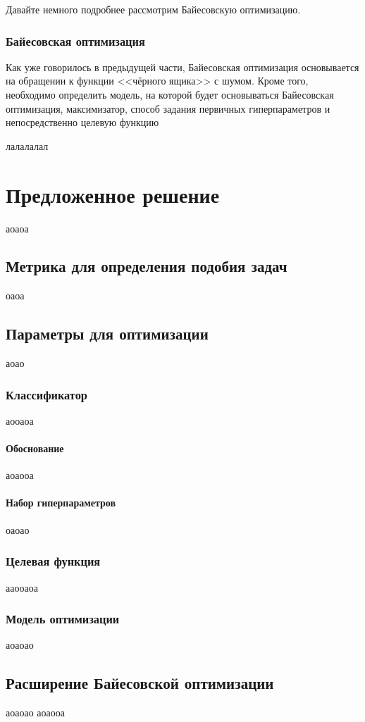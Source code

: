 \documentclass[times,specification,annotation]{itmo-student-thesis}
\begin{document}
	Давайте немного подробнее рассмотрим Байесовскую оптимизацию.
	
	\subsection{Байесовская оптимизация}
	Как уже говорилось в предыдущей части, Байесовская оптимизация основывается на обращении к функции <<чёрного ящика>> с шумом. Кроме того, необходимо определить модель, на которой будет основываться Байесовская оптимизация, максимизатор, способ задания первичных гиперпараметров и непосредственно целевую функцию
	
	
	\chapterconclusion
	лалалалал
	
	\chapter{Предложенное решение}
	аоаоа
	\section{Метрика для определения подобия задач}
	оаоа
	\section{Параметры для оптимизации}
	аоао\cite{thornton2013auto,feurer2015efficient,feurer2018practical}
	\subsection{Классификатор}
	аооаоа
	\subsubsection{Обоснование}
	аоаооа
	\subsubsection{Набор гиперпараметров}
	оаоао
	\subsection{Целевая функция}
	ааооаоа
	\subsection{Модель оптимизации}
	аоаоао
	\section{Расширение Байесовской оптимизации}
	аоаоао
	\chapterconclusion
	аоаооа
	
\end{document}
